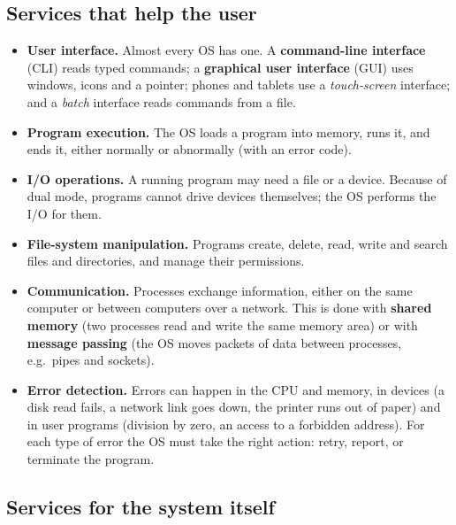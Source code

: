 \documentclass[11pt,a4paper]{article}
\newcommand{\term}[1]{\textbf{\color{mintdeep}#1}}
\begin{document}
\subsection{Services that help the user}

\begin{itemize}
  \item \textbf{User interface.} Almost every OS has one. A \term{command-line interface} (CLI) reads typed commands; a \term{graphical user interface} (GUI) uses windows, icons and a pointer; phones and tablets use a \emph{touch-screen} interface; and a \emph{batch} interface reads commands from a file.
  \item \textbf{Program execution.} The OS loads a program into memory, runs it, and ends it, either normally or abnormally (with an error code).
  \item \textbf{I/O operations.} A running program may need a file or a device. Because of dual mode, programs cannot drive devices themselves; the OS performs the I/O for them.
  \item \textbf{File-system manipulation.} Programs create, delete, read, write and search files and directories, and manage their permissions.
  \item \textbf{Communication.} Processes exchange information, either on the same computer or between computers over a network. This is done with \term{shared memory} (two processes read and write the same memory area) or with \term{message passing} (the OS moves packets of data between processes, e.g.\ pipes and sockets).
  \item \textbf{Error detection.} Errors can happen in the CPU and memory, in devices (a disk read fails, a network link goes down, the printer runs out of paper) and in user programs (division by zero, an access to a forbidden address). For each type of error the OS must take the right action: retry, report, or terminate the program.
\end{itemize}

\subsection{Services for the system itself}
\end{document}

